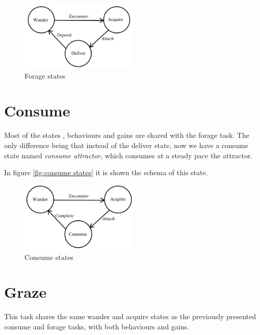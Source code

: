 \documentclass[12pt]{report}
\begin{document}
\begin{figure}[h!]
\centering
\includegraphics[width=0.5\textwidth]{"4 forage states"}
\caption{Forage states}
\label{fig:forage states}
\end{figure}
    
    
    
    
    
    
    
\section{Consume}

Most of the states , behaviours and gains are shared with the forage task. The only difference being that instead of the deliver state, now we have a consume state named \emph{consume attractor}, which consumes at a steady pace the attractor.

In figure \autoref{fig:consume states} it is shown the schema of this state.


\begin{figure}[h!]
\centering
\includegraphics[width=0.5\textwidth]{"5 consume states"}
\caption{Consume states}
\label{fig:consume states}
\end{figure}
  






\section{Graze}


This task shares the same wander and acquire states as the previously presented consume and forage tasks, with both behaviours and gains. 
\end{document}
